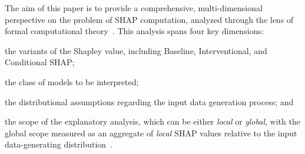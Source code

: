 

 The aim of this paper is to provide a comprehensive, multi-dimensional perspective on the problem of SHAP computation, analyzed through the lens of formal computational theory~\citep{arora2009computational}. This analysis spans four key dimensions: \begin{inparaenum}[(i)] \item the variants of the Shapley value, including Baseline, Interventional, and Conditional SHAP; \item the class of models to be interpreted; \item the distributional assumptions regarding the input data generation process; and \item the scope of the explanatory analysis, which can be either \emph{local} or \emph{global}, with the global scope measured as an aggregate of \emph{local} SHAP values relative to the input data-generating distribution~\citep{frye20}.\end{inparaenum}



